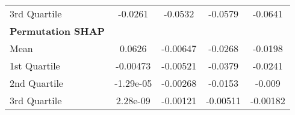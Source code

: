 {\begin{tabular} {lcccc}
\hspace{7pt}3rd Quartile & -0.0261 & -0.0532 & -0.0579 & -0.0641 \\ 
\addlinespace[1ex] 
\textbf{Permutation SHAP} &  &  &  &  \\ 
\hspace{7pt}Mean & 0.0626 & -0.00647 & -0.0268 & -0.0198 \\ 
\hspace{7pt}1st Quartile & -0.00473 & -0.00521 & -0.0379 & -0.0241 \\ 
\hspace{7pt}2nd Quartile & -1.29e-05 & -0.00268 & -0.0153 & -0.009 \\ 
\hspace{7pt}3rd Quartile & 2.28e-09 & -0.00121 & -0.00511 & -0.00182 \\ 
\bottomrule
\end{tabular}}